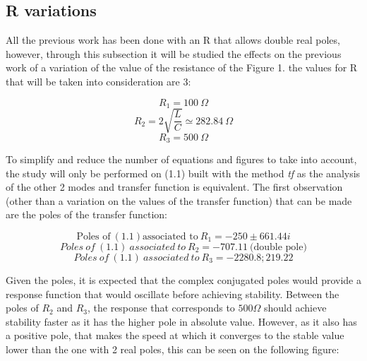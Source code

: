 \documentclass[a4paper,12pt]{article}
\begin{document}
\vspace{0.5cm}

\subsection{R variations}

\vspace{0.5cm}

All the previous work has been done with an R that allows double real poles, however, through this subsection it will be studied the effects on the previous work of a variation of the value of the resistance of the Figure 1. the values for R that will be taken into consideration are 3:

\vspace{0.5cm}

\[ R_1 = 100\ \Omega\]
\[R_2 = 2 \sqrt{\frac{L}{C}} \simeq 282.84\ \Omega\]
\[R_3 = 500\ \Omega\]

\vspace{0.5cm}

To simplify and reduce the number of equations and figures to take into account, the study will only be performed on (1.1) built with the method \textit{tf} as the analysis of the other 2 modes and transfer function is equivalent. The first observation (other than a variation on the values of the transfer function) that can be made are the poles of the transfer function:

\vspace{0.5cm}

\[\text{Poles \ of} \ (1.1) \text{associated to} \ R_1 = -250 \pm 661.44i\]
\[Poles \ of \ (1.1) \ associated \ to \ R_2 = -707.11\ \text{(double pole)}\]
\[Poles \ of \ (1.1) \ associated \ to \ R_3 =   -2280.8; 219.22\]

\vspace{0.5cm}

Given the poles, it is expected that the complex conjugated poles would provide a response function that would oscillate before achieving stability. Between the poles of \(R_2\) and \(R_3\), the response that corresponds to \(500\Omega\) should achieve stability faster as it has the higher pole in absolute value. However, as it also has a positive pole, that makes the speed at which it converges to the stable value lower than the one with 2 real poles, this can be seen on the following figure:

\vspace{0.5cm}
\end{document}

